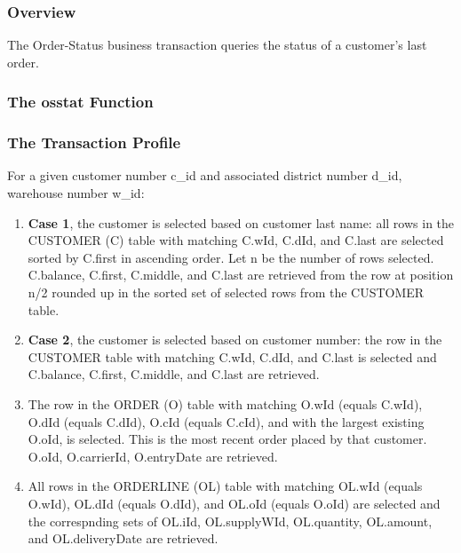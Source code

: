\subsubsection {Overview}
The Order-Status business transaction queries the status of a customer's last order.

\subsubsection{The osstat Function}



\subsubsection{The Transaction Profile}

For a given customer number c\_id and associated district number d\_id, warehouse number w\_id: 

\begin{enumerate}
    \item \textbf{Case 1}, the customer is selected based on customer last name: all rows in the CUSTOMER (C) table with matching C.wId, C.dId, and C.last are selected sorted by C.first in ascending order. Let n be the number of rows selected. C.balance, C.first, C.middle, and C.last are retrieved from the row at position n/2 rounded up in the sorted set of selected rows from the CUSTOMER table. 
    \item \textbf{Case 2}, the customer is selected based on customer number: the row in the CUSTOMER table with matching C.wId, C.dId, and C.last is selected and C.balance, C.first, C.middle, and C.last are retrieved.
    
    \item The row in the ORDER (O) table with matching O.wId (equals C.wId), O.dId (equals C.dId), O.cId (equals C.cId), and with the largest existing O.oId, is selected. This is the most recent order placed by that customer. O.oId, O.carrierId, O.entryDate are retrieved.
    
    \item All rows in the ORDERLINE (OL) table with matching OL.wId (equals O.wId), OL.dId (equals O.dId), and OL.oId (equals O.oId) are selected and the correspnding sets of OL.iId, OL.supplyWId, OL.quantity, OL.amount, and OL.deliveryDate are retrieved.
    
\end{enumerate}
